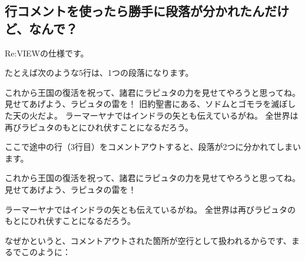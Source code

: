 \subsection*{行コメントを使ったら勝手に段落が分かれたんだけど、なんで？}
\label{sec:2-1-2}

Re:VIEWの仕様です。

たとえば次のような5行は、1つの段落になります。

\begin{starterprogram}\end{starterprogram}
\noindent
{}

\starterresult

これから王国の復活を祝って、諸君にラピュタの力を見せてやろうと思ってね。
見せてあげよう、ラピュタの雷を！
旧約聖書にある、ソドムとゴモラを滅ぼした天の火だよ。
ラーマーヤナではインドラの矢とも伝えているがね。
全世界は再びラピュタのもとにひれ伏すことになるだろう。

\endstarterresult

ここで途中の行（3行目）をコメントアウトすると、段落が2つに分かれてしまいます。

\begin{starterprogram}\end{starterprogram}
\noindent
{}

\starterresult

これから王国の復活を祝って、諸君にラピュタの力を見せてやろうと思ってね。
見せてあげよう、ラピュタの雷を！

ラーマーヤナではインドラの矢とも伝えているがね。
全世界は再びラピュタのもとにひれ伏すことになるだろう。

\endstarterresult

なぜかというと、コメントアウトされた箇所が空行として扱われるからです、まるでこのように：

